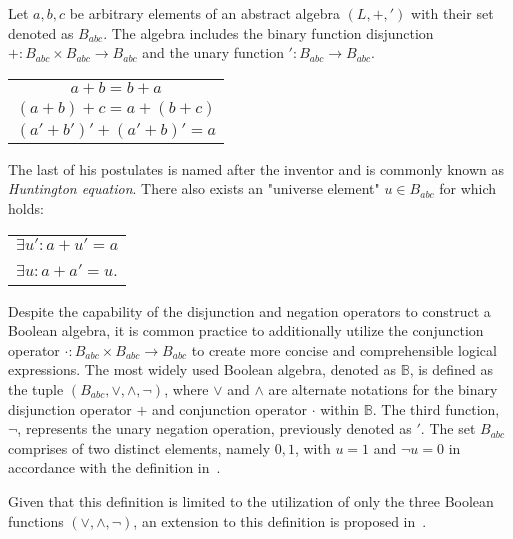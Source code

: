 \begin{definition}\label{Def:BasBool}
	Let $a, b, c$ be arbitrary elements of an abstract algebra $(L, +, ')$ with their set denoted as $B_{abc}$. The algebra includes the binary function disjunction $+ : B_{abc} \times B_{abc} \rightarrow B_{abc}$ and the unary function $' : B_{abc} \rightarrow B_{abc}$.
	\begin{table}[h]
		\centering
		\begin{tabular}{c}
			$a + b = b + a$ \\
			$(a + b) + c =  a + (b + c)$\\
			$(a' + b')' + (a' + b)' = a$\\
		\end{tabular}
	\end{table}
	
	The last of his postulates is named after the inventor and is commonly known as \textit{Huntington equation}. 
	\newpage
	There also exists an "universe element" $u \in B_{abc}$ for which holds:
	
	\begin{table}[h]
		\centering
		\begin{tabular}{l}
			$\exists u' : a + u' = a$ \\
			$\exists u : a + a' = u$. \\
		\end{tabular}
	\end{table}
	
\end{definition}

Despite the capability of the disjunction and negation operators to construct a Boolean algebra, it is common practice to additionally utilize the conjunction operator $\cdot : B_{abc} \times B_{abc} \rightarrow B_{abc}$ to create more concise and comprehensible logical expressions.
The most widely used Boolean algebra, denoted as $\mathbb{B}$, is defined as the tuple $(B_{abc}, \vee, \wedge, \neg)$, where $\vee$ and $\wedge$ are alternate notations for the binary disjunction operator $+$ and conjunction operator $\cdot$ within $\mathbb{B}$. The third function, $\neg$, represents the unary negation operation, previously denoted as $'$. The set $B_{abc}$ comprises of two distinct elements, namely ${0, 1}$, with $u=1$ and $\neg u = 0$ in accordance with the definition in~\cite{Boolean_def}.

Given that this definition is limited to the utilization of only the three Boolean functions $(\vee, \wedge, \neg)$, an extension to this definition is proposed in~\cite{muti_output_boolean_function}.

